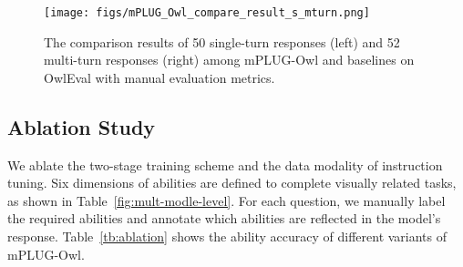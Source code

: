 \documentclass{article}
\newcommand{\modelname}{mPLUG-Owl\xspace}
\newcommand{\evalsetname}{OwlEval\xspace}
\begin{document}
\begin{figure}[!ht]
    \centering
    \texttt{[image: figs/mPLUG\_Owl\_compare\_result\_s\_mturn.png]}
    \caption{The comparison results of 50 single-turn responses (left) and 52 multi-turn responses (right) among mPLUG-Owl and baselines on \evalsetname with manual evaluation metrics.}
    \label{fig:compare_result_s_m}
    \vspace{-2mm}
\end{figure}



\subsection{Ablation Study}

We ablate the two-stage training scheme and the data modality of instruction tuning. Six dimensions of abilities are defined to complete visually related tasks, as shown in Table~\ref{fig:mult-modle-level}. For each question, we manually label the required abilities and annotate which abilities are reflected in the model's response. Table~\ref{tb:ablation} shows the  ability accuracy of different variants of \modelname.
\end{document}
